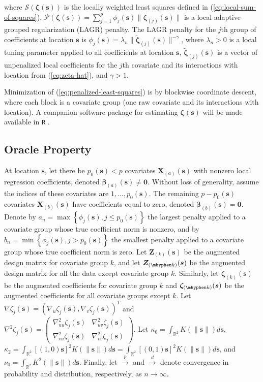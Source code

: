 \documentclass[authoryear,review, 12pt]{elsarticle}
\begin{document}
where $\mathcal{S}\left(\bm{\zeta}\left(\bm{s}\right)\right)$ is
the locally weighted least squares defined in (\ref{eq:local-sum-of-squares}),
$\mathcal{P}\left(\bm{\zeta}(\bm{s})\right)=\sum_{j=1}^{p}\phi_{j}(\bm{s})\|\bm{\zeta}_{(j)}(\bm{s})\|$
is a local adaptive grouped regularization (LAGR) penalty. The LAGR
penalty for the $j$th group of coefficients at location $\bm{s}$
is $\phi_{j}(\bm{s})=\lambda_{n}\|\tilde{\bm{\zeta}}_{(j)}(\bm{s})\|^{-\gamma}$,
where $\lambda_{n}>0$ is a local tuning parameter applied to all
coefficients at location $\bm{s}$, $\tilde{\bm{\zeta}}_{(j)}(\bm{s})$
is a vector of unpenalized local coefficients for the $j$th covariate
and its interactions with location from (\ref{eq:zeta-hat}), and $\gamma>1$.

Minimization of (\ref{eq:penalized-least-squares}) is by blockwise
coordinate descent, where each block is a covariate group (one raw
covariate and its interactions with location). A companion software package for estimating
$\bm{\zeta}(\bm{s})$ will be made available in \texttt{R} \citep{R-Core-2014}.

\subsection{Oracle Property\label{sub:oracle-properties}}

At location $\bm{s}$, let there be $p_{0}(\bm{s})<p$ covariates $\bm{X}_{(a)}(\bm{s})$
with nonzero local regression coefficients, denoted $\bm{\beta}_{(a)}(\bm{s})\ne\bm{0}$.
Without loss of generality, assume the indices of these covariates
are $1,\dots,p_{0}(\bm{s})$. The remaining $p-p_{0}(\bm{s})$ covariates $\bm{X}_{(b)}(\bm{s})$
have coefficients equal to zero, denoted $\bm{\beta}_{(b)}(\bm{s})=\bm{0}$.
Denote by $a_{n}=\max\left\{ \phi_{j}(\bm{s}),j\le p_{0}(\bm{s})\right\} $
the largest penalty applied to a covariate group whose true coefficient
norm is nonzero, and by $b_{n}=\min\left\{ \phi_{j}(\bm{s}),j>p_{0}(\bm{s})\right\} $
the smallest penalty applied to a covariate group whose true coefficient
norm is zero. Let $\bm{Z}_{(k)}(\bm{s})$ be the augmented design
matrix for covariate group $k$, and let $\bm{Z}_{(\mhyphen k)}(\bm{s})$
be the augmented design matrix for all the data except covariate group
$k$. Similarly, let $\bm{\zeta}_{(k)}(\bm{s})$ be the augmented
coefficients for covariate group $k$ and $\bm{\zeta}_{(\mhyphen k)}(\bm{s})$
be the augmented coefficients for all covariate groups except $k$.
Let $\nabla\zeta_{j}(\bm{s})=\left(\nabla_{u}\zeta_{j}(\bm{s}),\nabla_{v}\zeta_{j}(\bm{s})\right)^{T}$
and $\nabla^{2}\zeta_{j}(\bm{s})=\left(\begin{array}{cc}
\nabla_{uu}^{2}\zeta_{j}(\bm{s}) & \nabla_{uv}^{2}\zeta_{j}(\bm{s})\\
\nabla_{vu}^{2}\zeta_{j}(\bm{s}) & \nabla_{vv}^{2}\zeta_{j}(\bm{s})
\end{array}\right)$. Let $\kappa_{0}=\int_{\mathbb{R}^{2}}K(\|\bm{s}\|)d\bm{s}$, $\kappa_{2}=\int_{\mathbb{R}^{2}}[(1,0)\bm{s}]^{2}K(\|\bm{s}\|)d\bm{s}=\int_{\mathbb{R}^{2}}[(0,1)\bm{s}]^{2}K(\|\bm{s}\|)d\bm{s}$,
and $\nu_{0}=\int_{\mathbb{R}^{2}}K^{2}(\|\bm{s}\|)d\bm{s}$. Finally,
let $\xrightarrow{p}$ and $\xrightarrow{d}$ denote convergence in
probability and distribution, respectively, as $n\to\infty$.
\end{document}
